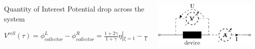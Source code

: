 \documentclass[8pt]{beamer}
\begin{document}
\begin{frame}
\begin{columns}
\begin{column}{.65\textwidth}
\begin{alertblock}{Quantity of Interest}
 Potential drop across the system
 
 $V^{cell}(\tau) = \phi_{collector}^L - \phi_{collector}^R
= \frac{1+2\gamma}{1+\gamma}\eta|_{\xi=1} - \frac{\gamma}{1+\gamma}\eta|_{\xi=0} - \frac{\gamma}{(1+\gamma)^2}I
 $
\end{alertblock} 
\end{column}
\begin{column}{.3\textwidth} 
    \includegraphics[trim = 0in 0in 0.in 0.2in, clip, width=0.95\textwidth]{figs_report/device.png}
\end{column}
\end{columns}



\vfill
\end{frame}
\end{document}
